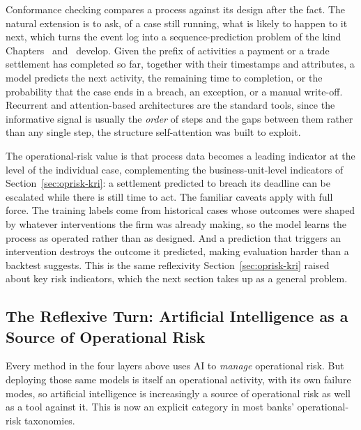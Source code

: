 \documentclass[../ai_in_finance]{subfiles}
\begin{document}
Conformance checking compares a process against its design after the fact. The natural extension is to ask, of a case still running, what is likely to happen to it next, which turns the event log into a sequence-prediction problem of the kind Chapters~ and~ develop. Given the prefix of activities a payment or a trade settlement has completed so far, together with their timestamps and attributes, a model predicts the next activity, the remaining time to completion, or the probability that the case ends in a breach, an exception, or a manual write-off. Recurrent and attention-based architectures are the standard tools, since the informative signal is usually the \emph{order} of steps and the gaps between them rather than any single step, the structure self-attention was built to exploit.

The operational-risk value is that process data becomes a leading indicator at the level of the individual case, complementing the business-unit-level indicators of Section~\ref{sec:oprisk-kri}: a settlement predicted to breach its deadline can be escalated while there is still time to act. The familiar caveats apply with full force. The training labels come from historical cases whose outcomes were shaped by whatever interventions the firm was already making, so the model learns the process as operated rather than as designed. And a prediction that triggers an intervention destroys the outcome it predicted, making evaluation harder than a backtest suggests. This is the same reflexivity Section~\ref{sec:oprisk-kri} raised about key risk indicators, which the next section takes up as a general problem.

\subsection{The Reflexive Turn: Artificial Intelligence as a Source of Operational Risk}
\label{sec:oprisk-reflexive}

Every method in the four layers above uses AI to \emph{manage} operational risk. But deploying those same models is itself an operational activity, with its own failure modes, so artificial intelligence is increasingly a source of operational risk as well as a tool against it. This is now an explicit category in most banks' operational-risk taxonomies.
\end{document}
